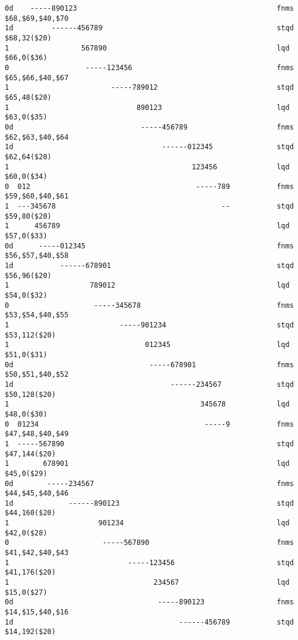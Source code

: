 \begin{verbatim}
0d    -----890123                                              	fnms	$68,$69,$40,$70
1d         ------456789                                        	stqd	$68,32($20)
1                 567890                                       	lqd	$66,0($36)
0                  -----123456                                 	fnms	$65,$66,$40,$67
1                        -----789012                           	stqd	$65,48($20)
1                              890123                          	lqd	$63,0($35)
0d                              -----456789                    	fnms	$62,$63,$40,$64
1d                                   ------012345              	stqd	$62,64($20)
1                                           123456             	lqd	$60,0($34)
0  012                                       -----789          	fnms	$59,$60,$40,$61
1  ---345678                                       --          	stqd	$59,80($20)
1      456789                                                  	lqd	$57,0($33)
0d      -----012345                                            	fnms	$56,$57,$40,$58
1d           ------678901                                      	stqd	$56,96($20)
1                   789012                                     	lqd	$54,0($32)
0                    -----345678                               	fnms	$53,$54,$40,$55
1                          -----901234                         	stqd	$53,112($20)
1                                012345                        	lqd	$51,0($31)
0d                                -----678901                  	fnms	$50,$51,$40,$52
1d                                     ------234567            	stqd	$50,128($20)
1                                             345678           	lqd	$48,0($30)
0  01234                                       -----9          	fnms	$47,$48,$40,$49
1  -----567890                                                 	stqd	$47,144($20)
1        678901                                                	lqd	$45,0($29)
0d        -----234567                                          	fnms	$44,$45,$40,$46
1d             ------890123                                    	stqd	$44,160($20)
1                     901234                                   	lqd	$42,0($28)
0                      -----567890                             	fnms	$41,$42,$40,$43
1                            -----123456                       	stqd	$41,176($20)
1                                  234567                      	lqd	$15,0($27)
0d                                  -----890123                	fnms	$14,$15,$40,$16
1d                                       ------456789          	stqd	$14,192($20)

\end{verbatim}
